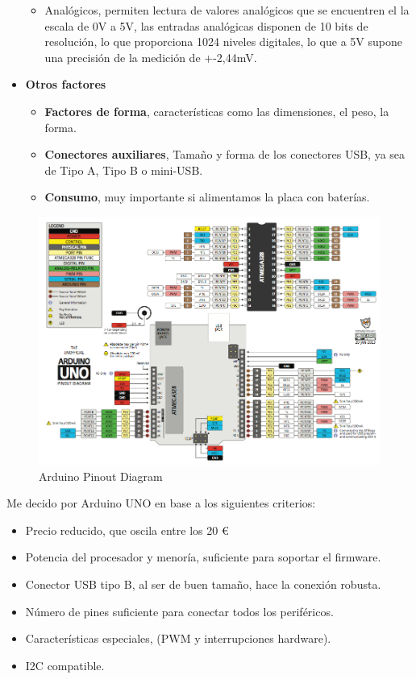 \begin{itemize}
\begin{itemize}
		\item{Analógicos}, permiten lectura de valores analógicos que se encuentren el la escala de 0V a 5V, las entradas analógicas disponen de 10 bits de resolución, lo que proporciona 1024 niveles digitales, lo que a 5V supone una precisión de la medición de +-2,44mV. 
		
		
	\end{itemize}
	
	\item \textbf{Otros factores}
	\begin{itemize}
		\item \textbf{Factores de forma}, características como las dimensiones, el peso, la forma.
		\item \textbf{Conectores auxiliares}, Tamaño y forma de los conectores USB, ya sea de Tipo A, Tipo B o mini-USB. 
		\item \textbf{Consumo}, muy importante si alimentamos la placa con  baterías. 
		
	\end{itemize}	
\end{itemize}


\begin{figure}[h]
\centering
\includegraphics[width=0.8\linewidth]{../images/arduino_data}
\caption{Arduino Pinout Diagram}
\label{fig:arduino_data}
\end{figure}


\newpage

Me decido por Arduino UNO en base a los siguientes criterios:

\begin{itemize}
	\item{Precio reducido}, que oscila entre los 20 \euro
	\item{Potencia del procesador y menoría}, suficiente para soportar el firmware.
	\item{Conector USB tipo B}, al ser de buen tamaño, hace la conexión robusta.
	\item{Número de pines} suficiente para conectar todos los periféricos.
	\item{Características especiales}, (PWM y interrupciones hardware). 
	\item{I2C} compatible. 
\end{itemize}


